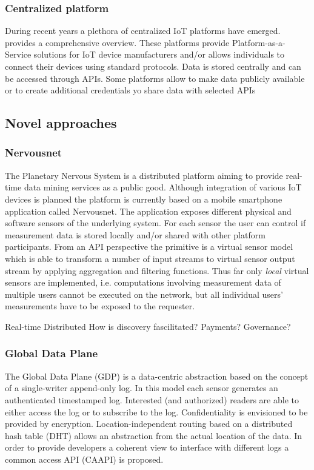 \subsubsection{Centralized platform}

During recent years a plethora of centralized IoT platforms have emerged. \cite{DBLP:journals/corr/MineraudMST15a} provides a comprehensive overview. These platforms provide Platform-as-a-Service solutions for IoT device manufacturers and/or allows individuals to connect their devices using standard protocols. Data is stored centrally and can be accessed through APIs. Some platforms allow to make data publicly available or to create additional credentials yo share data with selected APIs

\subsection{Novel approaches}

\subsubsection{Nervousnet}

The Planetary Nervous System is a distributed platform aiming to provide real-time data mining services as a public good. Although integration of various IoT devices is planned the platform is currently based on a mobile smartphone application called Nervousnet. The application exposes different physical and software sensors of the underlying system. For each sensor the user can control if measurement data is stored locally and/or shared with other platform participants. From an API perspective the primitive is a virtual sensor model which is able to transform a number of input streams to virtual sensor output stream by applying aggregation and filtering functions. Thus far only \emph{local} virtual sensors are implemented, i.e. computations involving measurement data of multiple users cannot be executed on the network, but all individual users' measurements have to be exposed to the requester. 

Real-time
Distributed
How is discovery fascilitated? Payments? Governance?


\subsubsection{Global Data Plane}

The Global Data Plane (GDP) is a data-centric abstraction based on the concept of a single-writer append-only log. In this model each sensor generates an authenticated timestamped log. Interested (and authorized) readers are able to either access the log or to subscribe to the log. Confidentiality is envisioned to be provided by encryption. Location-independent routing based on a distributed hash table (DHT) allows an abstraction from the actual location of the data. In order to provide developers a coherent view to interface with different logs a common access API (CAAPI) is proposed. 

